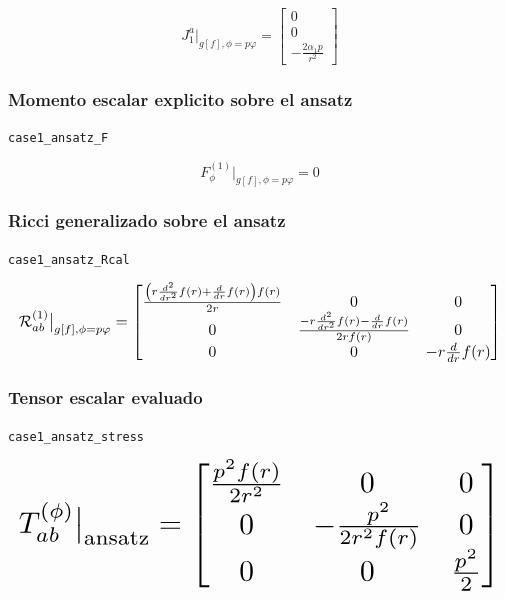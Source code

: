 \documentclass[11pt,a4paper]{article}
\begin{document}
\[
J_1^a\big|_{g[f],\phi=p\varphi} = \left[\begin{matrix}0\\0\\- \frac{2 \alpha_{1} p}{r^{2}}\end{matrix}\right]
\]

\subsubsection{Momento escalar explicito sobre el ansatz}

\noindent\texttt{case1\_ansatz\_F}\par\nopagebreak[4]

\[
F_\phi^{(1)}\big|_{g[f],\phi=p\varphi} = 0
\]

\subsubsection{Ricci generalizado sobre el ansatz}

\noindent\texttt{case1\_ansatz\_Rcal}\par\nopagebreak[4]

\[
\resizebox{\textwidth}{!}{$\displaystyle \mathcal R^{(1)}_{ab}\big|_{g[f],\phi=p\varphi} = \left[\begin{matrix}\frac{\left(r \frac{d^{2}}{d r^{2}} f{\left(r \right)} + \frac{d}{d r} f{\left(r \right)}\right) f{\left(r \right)}}{2 r} & 0 & 0\\0 & \frac{- r \frac{d^{2}}{d r^{2}} f{\left(r \right)} - \frac{d}{d r} f{\left(r \right)}}{2 r f{\left(r \right)}} & 0\\0 & 0 & - r \frac{d}{d r} f{\left(r \right)}\end{matrix}\right]$}
\]

\subsubsection{Tensor escalar evaluado}

\noindent\texttt{case1\_ansatz\_stress}\par\nopagebreak[4]

\[
\resizebox{\textwidth}{!}{$\displaystyle T^{(\phi)}_{ab}\big|_{\mathrm{ansatz}} = \left[\begin{matrix}\frac{p^{2} f{\left(r \right)}}{2 r^{2}} & 0 & 0\\0 & - \frac{p^{2}}{2 r^{2} f{\left(r \right)}} & 0\\0 & 0 & \frac{p^{2}}{2}\end{matrix}\right]$}
\]
\end{document}
